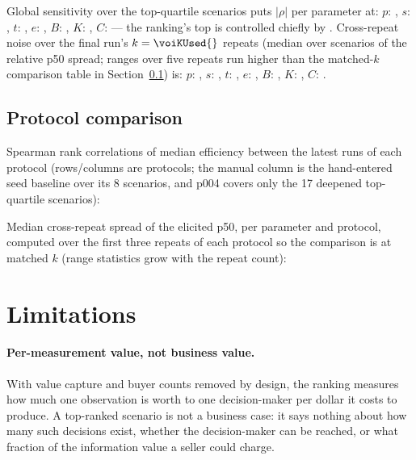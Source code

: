 \documentclass[11pt]{article}
\begin{document}
Global sensitivity over the top-quartile scenarios puts
$|\rho|$ per parameter at: $p$: \voiGlobalP, $s$: \voiGlobalS, $t$:
\voiGlobalT, $e$: \voiGlobalE, $B$: \voiGlobalB, $K$: \voiGlobalK, $C$:
\voiGlobalC{} --- the ranking's top is controlled chiefly by
\voiGlobalTopParams. Cross-repeat noise over the final run's
$k=\voiKUsed{}$ repeats (median over scenarios of the relative p50 spread;
ranges over five repeats run higher than the matched-$k$ comparison table in
Section~\ref{sec:protocols}) is: $p$: \voiNoiseP, $s$: \voiNoiseS, $t$:
\voiNoiseT, $e$: \voiNoiseE, $B$: \voiNoiseB, $K$: \voiNoiseK, $C$: \voiNoiseC.

\subsection{Protocol comparison}
\label{sec:protocols}

Spearman rank correlations of median efficiency between the latest runs of
each protocol (rows/columns are protocols; the manual column is the
hand-entered seed baseline over its 8 scenarios, and p004 covers only the 17
deepened top-quartile scenarios):

\begin{center}

\end{center}

Median cross-repeat spread of the elicited p50, per parameter and protocol,
computed over the first three repeats of each protocol so the comparison is
at matched $k$ (range statistics grow with the repeat count):

\begin{center}

\end{center}



\FloatBarrier
\section{Limitations}
\label{sec:limitations}

\paragraph{Per-measurement value, not business value.} With value capture and
buyer counts removed by design, the ranking measures how much one observation
is worth to one decision-maker per dollar it costs to produce. A top-ranked
scenario is not a business case: it says nothing about how many such decisions
exist, whether the decision-maker can be reached, or what fraction of the
information value a seller could charge.
\end{document}
